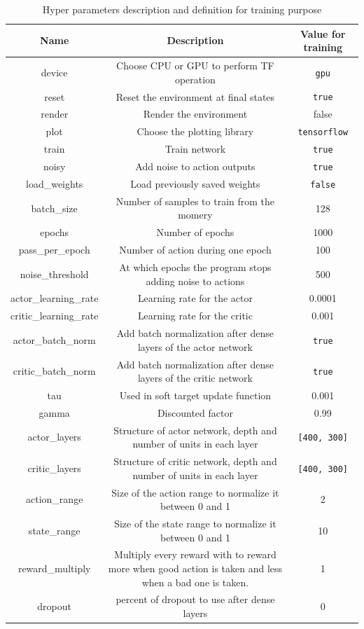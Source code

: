 \documentclass{article}
\begin{document}
\begin{table}[ht]
  \centering
  \begin{adjustbox}{width=1\textwidth}
    \begin{tabular}{ |c|c|c| }
      \hline
      \textbf{Name} & \textbf{Description} & \textbf{Value for training} \\
      \hline
      device & Choose CPU or GPU to perform TF operation & \verb?gpu? \\
      reset & Reset the environment at final states & \verb?true? \\ 
      render & Render the environment\footnotemark & false \\
      plot & Choose the plotting library & \verb?tensorflow? \\
      train & Train network & \verb?true? \\
      noisy & Add noise to action outputs & \verb?true? \\
      load\_weights & Load previously saved weights & \verb?false? \\
      batch\_size & Number of samples to train from the momery & 128 \\
      epochs & Number of epochs & 1000 \\
      pass\_per\_epoch & Number of action during one epoch & 100 \\ 
      noise\_threshold & At which epochs the program stops adding noise to actions & 500 \\
      actor\_learning\_rate & Learning rate for the actor & 0.0001 \\
      critic\_learning\_rate & Learning rate for the critic & 0.001 \\
      actor\_batch\_norm & Add batch normalization after dense layers of the actor network & \verb?true? \\
      critic\_batch\_norm & Add batch normalization after dense layers of the critic network & \verb?true? \\
      tau & Used in soft target update function & 0.001 \\
      gamma & Discounted factor & 0.99 \\
      actor\_layers & Structure of actor network, depth and number of units in each layer & \verb?[400, 300]? \\
      critic\_layers & Structure of critic network, depth and number of units in each layer & \verb?[400, 300]? \\
      action\_range & Size of the action range to normalize it between 0 and 1 & 2 \\
      state\_range & Size of the state range to normalize it between 0 and 1 & 10 \\
      reward\_multiply & Multiply every reward with to reward more when good action is taken and less when a bad one is taken. & 1 \\
      dropout & percent of dropout to use after dense layers & 0 \\
      \hline
    \end{tabular}
  \end{adjustbox}
  \caption{Hyper parameters description and definition for training purpose}
  \label{tab:hyperparams}
\end{table}
\end{document}
